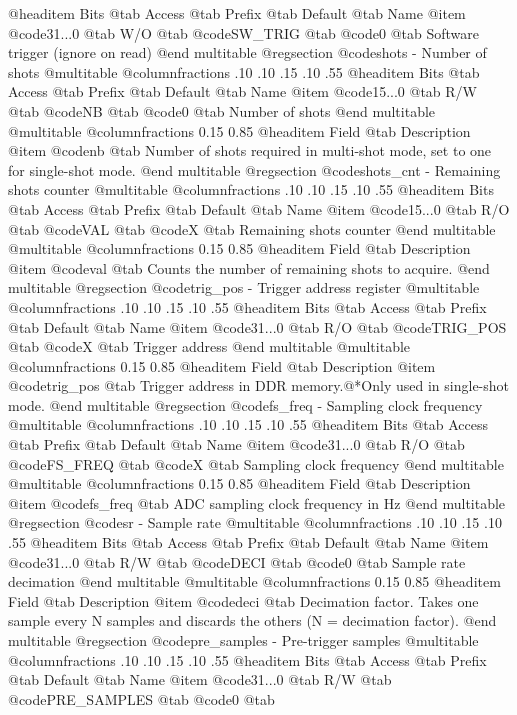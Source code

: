 @headitem Bits @tab Access @tab Prefix @tab Default @tab Name
@item @code{31...0}
@tab W/O @tab
@code{SW_TRIG}
@tab @code{0} @tab 
Software trigger (ignore on read)
@end multitable
@regsection @code{shots} - Number of shots
@multitable @columnfractions .10 .10 .15 .10 .55
@headitem Bits @tab Access @tab Prefix @tab Default @tab Name
@item @code{15...0}
@tab R/W @tab
@code{NB}
@tab @code{0} @tab 
Number of shots
@end multitable
@multitable @columnfractions 0.15 0.85
@headitem Field @tab Description
@item @code{nb} @tab Number of shots required in multi-shot mode, set to one for single-shot mode.
@end multitable
@regsection @code{shots_cnt} - Remaining shots counter
@multitable @columnfractions .10 .10 .15 .10 .55
@headitem Bits @tab Access @tab Prefix @tab Default @tab Name
@item @code{15...0}
@tab R/O @tab
@code{VAL}
@tab @code{X} @tab 
Remaining shots counter
@end multitable
@multitable @columnfractions 0.15 0.85
@headitem Field @tab Description
@item @code{val} @tab Counts the number of remaining shots to acquire.
@end multitable
@regsection @code{trig_pos} - Trigger address register
@multitable @columnfractions .10 .10 .15 .10 .55
@headitem Bits @tab Access @tab Prefix @tab Default @tab Name
@item @code{31...0}
@tab R/O @tab
@code{TRIG_POS}
@tab @code{X} @tab 
Trigger address
@end multitable
@multitable @columnfractions 0.15 0.85
@headitem Field @tab Description
@item @code{trig_pos} @tab Trigger address in DDR memory.@*Only used in single-shot mode.
@end multitable
@regsection @code{fs_freq} - Sampling clock frequency
@multitable @columnfractions .10 .10 .15 .10 .55
@headitem Bits @tab Access @tab Prefix @tab Default @tab Name
@item @code{31...0}
@tab R/O @tab
@code{FS_FREQ}
@tab @code{X} @tab 
Sampling clock frequency
@end multitable
@multitable @columnfractions 0.15 0.85
@headitem Field @tab Description
@item @code{fs_freq} @tab ADC sampling clock frequency in Hz
@end multitable
@regsection @code{sr} - Sample rate
@multitable @columnfractions .10 .10 .15 .10 .55
@headitem Bits @tab Access @tab Prefix @tab Default @tab Name
@item @code{31...0}
@tab R/W @tab
@code{DECI}
@tab @code{0} @tab 
Sample rate decimation
@end multitable
@multitable @columnfractions 0.15 0.85
@headitem Field @tab Description
@item @code{deci} @tab Decimation factor. Takes one sample every N samples and discards the others (N = decimation factor).
@end multitable
@regsection @code{pre_samples} - Pre-trigger samples
@multitable @columnfractions .10 .10 .15 .10 .55
@headitem Bits @tab Access @tab Prefix @tab Default @tab Name
@item @code{31...0}
@tab R/W @tab
@code{PRE_SAMPLES}
@tab @code{0} @tab 
